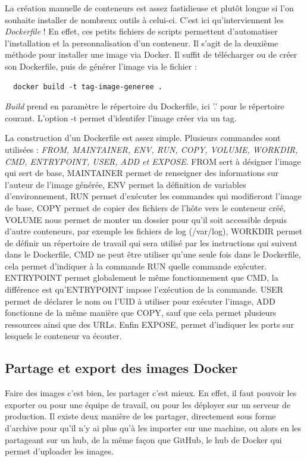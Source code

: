 \documentclass[12pt,a4paper]{article}
\begin{document}
La création manuelle de conteneurs est assez fastidieuse et plutôt longue si l'on souhaite installer de nombreux outils à celui-ci. C'est ici qu'interviennent les \textit{Dockerfile} ! En effet, ces petits fichiers de scripts permettent d'automatiser l'installation et la personnalisation d'un conteneur. Il s'agit de la deuxième méthode pour installer une image via Docker. Il suffit de télécharger ou de créer son Dockerfile, puis de générer l'image via le fichier :
\begin{lstlisting}
  docker build -t tag-image-generee .
\end{lstlisting}
\textit{Build} prend en paramètre le répertoire du Dockerfile, ici '.' pour le répertoire courant. L'option -t permet d'identifer l'image créer via un tag.

La construction d'un Dockerfile est assez simple. Plusieurs commandes sont utilisées : \textit{FROM, MAINTAINER, ENV, RUN, COPY, VOLUME, WORKDIR, CMD, ENTRYPOINT, USER, ADD et EXPOSE}. FROM sert à désigner l'image qui sert de base, MAINTAINER permet de renseigner des informations sur l'auteur de l'image générée, ENV permet la définition de variables d'environnement, RUN permet d'exécuter les commandes qui modifieront l'image de base, COPY permet de copier des fichiers de l'hôte vers le conteneur créé, VOLUME nous permet de monter un dossier pour qu'il soit accessible depuis d'autre conteneurs, par exemple les fichiers de log (/var/log), WORKDIR permet de définir un répertoire de travail qui sera utilisé par les instructions qui suivent dans le Dockerfile, CMD ne peut être utiliser qu'une seule fois dans le Dockerfile, cela permet d'indiquer à la commande RUN quelle commande exécuter. ENTRYPOINT permet globalement le même fonctionnement que CMD, la différence est qu'ENTRYPOINT impose l'exécution de la commande. USER permet de déclarer le nom ou l'UID à utiliser pour exécuter l'image, ADD fonctionne de la même manière que COPY, sauf que cela permet plusieurs ressources ainsi que des URLs. Enfin EXPOSE, permet d'indiquer les ports sur lesquels le conteneur va écouter. 

\subsection{Partage et export des images Docker}

Faire des images c'est bien, les partager c'est mieux. En effet, il faut pouvoir les exporter ou pour une équipe de travail, ou pour les déployer sur un serveur de production. Il existe deux manière de les partager, directement sous forme d'archive pour qu'il n'y ai plus qu'à les importer sur une machine, ou alors en les partageant sur un hub, de la même façon que GitHub, le hub de Docker qui permet d'uploader les images.
\end{document}

